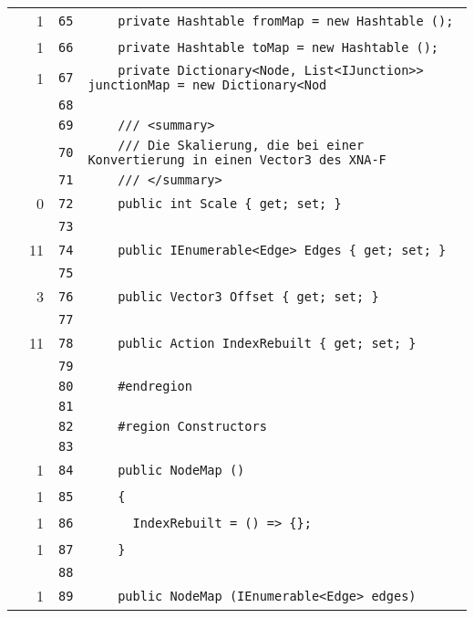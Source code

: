 \documentclass[a4paper,10pt]{article}
\begin{document}
\begin{longtable}[l]{lrrl}
\cellcolor{green} & 1 & \verb~65~ & \verb~    private Hashtable fromMap = new Hashtable ();~\\
\cellcolor{green} & 1 & \verb~66~ & \verb~    private Hashtable toMap = new Hashtable ();~\\
\cellcolor{green} & 1 & \verb~67~ & \verb~    private Dictionary<Node, List<IJunction>> junctionMap = new Dictionary<Nod~\\
\cellcolor{gray} &  & \verb~68~ & \verb~~\\
\cellcolor{gray} &  & \verb~69~ & \verb~    /// <summary>~\\
\cellcolor{gray} &  & \verb~70~ & \verb~    /// Die Skalierung, die bei einer Konvertierung in einen Vector3 des XNA-F~\\
\cellcolor{gray} &  & \verb~71~ & \verb~    /// </summary>~\\
\cellcolor{red} & 0 & \verb~72~ & \verb~    public int Scale { get; set; }~\\
\cellcolor{gray} &  & \verb~73~ & \verb~~\\
\cellcolor{green} & 11 & \verb~74~ & \verb~    public IEnumerable<Edge> Edges { get; set; }~\\
\cellcolor{gray} &  & \verb~75~ & \verb~~\\
\cellcolor{green} & 3 & \verb~76~ & \verb~    public Vector3 Offset { get; set; }~\\
\cellcolor{gray} &  & \verb~77~ & \verb~~\\
\cellcolor{green} & 11 & \verb~78~ & \verb~    public Action IndexRebuilt { get; set; }~\\
\cellcolor{gray} &  & \verb~79~ & \verb~~\\
\cellcolor{gray} &  & \verb~80~ & \verb~    #endregion~\\
\cellcolor{gray} &  & \verb~81~ & \verb~~\\
\cellcolor{gray} &  & \verb~82~ & \verb~    #region Constructors~\\
\cellcolor{gray} &  & \verb~83~ & \verb~~\\
\cellcolor{green} & 1 & \verb~84~ & \verb~    public NodeMap ()~\\
\cellcolor{green} & 1 & \verb~85~ & \verb~    {~\\
\cellcolor{green} & 1 & \verb~86~ & \verb~      IndexRebuilt = () => {};~\\
\cellcolor{green} & 1 & \verb~87~ & \verb~    }~\\
\cellcolor{gray} &  & \verb~88~ & \verb~~\\
\cellcolor{green} & 1 & \verb~89~ & \verb~    public NodeMap (IEnumerable<Edge> edges)~\\

\end{longtable}
\end{document}
